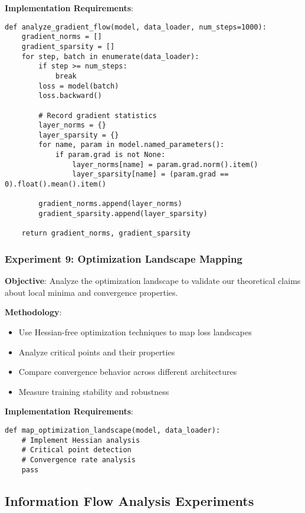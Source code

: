 \documentclass[11pt,a4paper]{article}
\begin{document}
\textbf{Implementation Requirements}:
\begin{verbatim}
def analyze_gradient_flow(model, data_loader, num_steps=1000):
    gradient_norms = []
    gradient_sparsity = []
    for step, batch in enumerate(data_loader):
        if step >= num_steps:
            break
        loss = model(batch)
        loss.backward()
        
        # Record gradient statistics
        layer_norms = {}
        layer_sparsity = {}
        for name, param in model.named_parameters():
            if param.grad is not None:
                layer_norms[name] = param.grad.norm().item()
                layer_sparsity[name] = (param.grad == 0).float().mean().item()
        
        gradient_norms.append(layer_norms)
        gradient_sparsity.append(layer_sparsity)
    
    return gradient_norms, gradient_sparsity
\end{verbatim}

\subsubsection{Experiment 9: Optimization Landscape Mapping}
\textbf{Objective}: Analyze the optimization landscape to validate our theoretical claims about local minima and convergence properties.

\textbf{Methodology}:
\begin{itemize}
    \item Use Hessian-free optimization techniques to map loss landscapes
    \item Analyze critical points and their properties
    \item Compare convergence behavior across different architectures
    \item Measure training stability and robustness
\end{itemize}

\textbf{Implementation Requirements}:
\begin{verbatim}
def map_optimization_landscape(model, data_loader):
    # Implement Hessian analysis
    # Critical point detection
    # Convergence rate analysis
    pass
\end{verbatim}

\subsection{Information Flow Analysis Experiments}
\end{document}
